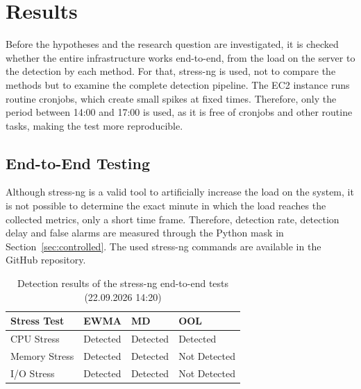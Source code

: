 
\section{Results}

Before the hypotheses and the research question are investigated, it is checked whether the entire infrastructure works end-to-end, from the load on the server to the detection by each method. For that, stress-ng is used, not to compare the methods but to examine the complete detection pipeline. The EC2 instance runs routine cronjobs, which create small spikes at fixed times. Therefore, only the period between 14:00 and 17:00 is used, as it is free of cronjobs and other routine tasks, making the test more reproducible.

\subsection{End-to-End Testing}
Although stress-ng is a valid tool to artificially increase the load on the system, it is not possible to determine the exact minute in which the load reaches the collected metrics, only a short time frame. Therefore, detection rate, detection delay and false alarms are measured through the Python mask in Section~\ref{sec:controlled}. The used stress-ng commands are available in the GitHub repository.

\begin{table}[H]
\centering
\begin{tabularx}{\textwidth}{p{4cm}XXX}
\toprule
\textbf{Stress Test} & \textbf{EWMA} & \textbf{MD} & \textbf{OOL} \\
\midrule
CPU Stress    & Detected & Detected & Detected \\
Memory Stress & Detected & Detected & Not Detected \\
I/O Stress    & Detected & Detected & Not Detected \\
\bottomrule
\end{tabularx}
\caption{Detection results of the stress-ng end-to-end tests (22.09.2026 14:20)}
\label{tab:stress_simulation_results}
\end{table}

